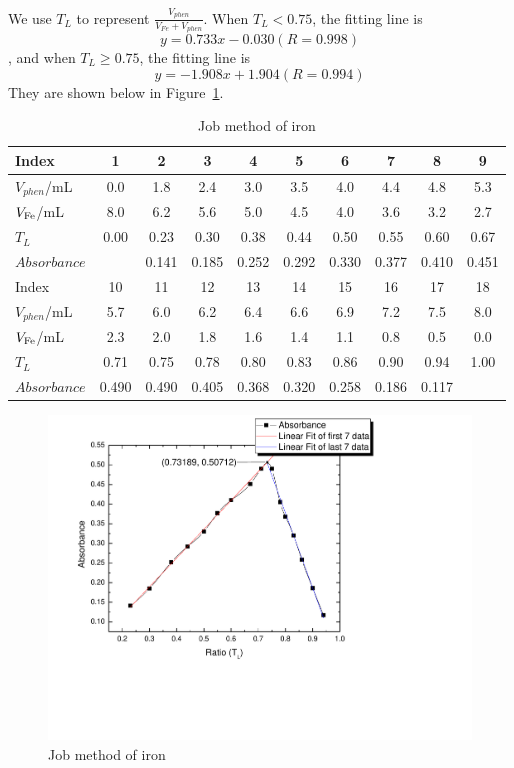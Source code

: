 We use $T_L$ to represent $\frac{V_{phen}}{V_{Fe}+V_{phen}}$. When $T_L<0.75$, the fitting line is$$y=0.733x-0.030(R=0.998)$$, and when $T_L\geq0.75$, the fitting line is$$y=-1.908x+1.904(R=0.994)$$They are shown below in Figure~\ref{iron}.

\begin{table}[H]
	\caption{Job method of iron}
	\label{Tab.Jbm}
	\begin{tabular}{lccccccccc}
	\toprule
	Index
	& 1 	& 2	 	&3		& 4 	& 5 	& 6 	& 7 	& 8		& 9\\
	\midrule
	$V_{phen}$/mL
	&0.0	&1.8	&2.4	&3.0	&3.5	&4.0	&4.4	&4.8	&5.3\\
	$V_{\ce{Fe}}$/mL
	&8.0	&6.2	&5.6	&5.0	&4.5	&4.0	&3.6	&3.2	&2.7\\
	$T_L$
	& 0.00 	&0.23	&0.30	&0.38	&0.44	&0.50	&0.55	&0.60	&0.67\\
	$Absorbance$
	&   	&0.141	&0.185	&0.252	&0.292	&0.330	&0.377	&0.410	&0.451\\
	\midrule
	Index
	& 10	& 11	& 12	&13		&14		&15		&16		&17		&18\\
	\midrule
	$V_{phen}$/mL
	&5.7	&6.0	&6.2	&6.4	&6.6	&6.9	&7.2	&7.5	&8.0\\
	$V_{\ce{Fe}}$/mL
	&2.3	&2.0	&1.8	&1.6	&1.4	&1.1	&0.8	&0.5	&0.0\\
	$T_L$
	&0.71	&0.75	&0.78	&0.80	&0.83	&0.86	&0.90	&0.94	&1.00\\
	$Absorbance$
	&0.490	&0.490	&0.405	&0.368	&0.320	&0.258	&0.186	&0.117	&\\
	\bottomrule
	\end{tabular}
\end{table}

\begin{figure}[H]
	\includegraphics[width=\linewidth]{iron.pdf}
	\caption{Job method of iron}
	\label{iron}
\end{figure}

